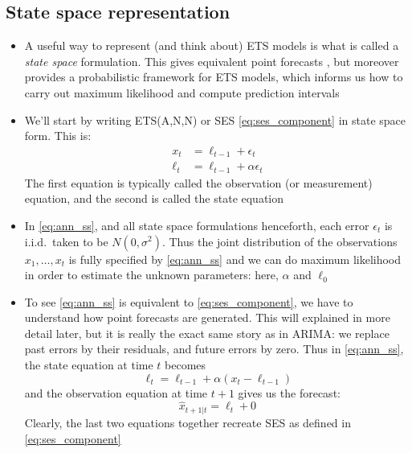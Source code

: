 \documentclass{article}
\begin{document}
\subsection{State space representation}

\begin{itemize}
\item A useful way to represent (and think about) ETS models is what is called
  a \emph{state space} formulation. This gives equivalent point forecasts 
  , but moreover provides a probabilistic framework 
  for ETS models, which informs us how to carry out maximum likelihood and
  compute prediction intervals

\item We'll start by writing ETS(A,N,N) or SES \eqref{eq:ses_component} in state
  space form. This is:  
  \begin{equation}
  \label{eq:ann_ss}
  \begin{aligned}
  x_t &= \ell_{t-1} + \epsilon_t \\
  \ell_t &= \ell_{t-1} + \alpha \epsilon_t
  \end{aligned}
  \end{equation}
  The first equation is typically called the observation (or measurement)
  equation, and the second is called the state equation
  
\item In \eqref{eq:ann_ss}, and all state space formulations henceforth, each
  error $\epsilon_t$ is i.i.d.\ taken to be $N(0, \sigma^2)$. Thus the joint
  distribution of the observations $x_1,\dots,x_t$ is fully specified by
  \eqref{eq:ann_ss} and we can do maximum likelihood in order to estimate the
  unknown parameters: here, $\alpha$ and $\ell_0$ 

\item To see \eqref{eq:ann_ss} is equivalent to \eqref{eq:ses_component}, we
  have to understand how point forecasts are generated. This will explained in
  more detail later, but it is really the exact same story as in ARIMA: we
  replace past errors by their residuals, and future errors by zero. Thus in
  \eqref{eq:ann_ss}, the state equation at time $t$ becomes   
  \[
  \ell_t = \ell_{t-1} + \alpha (x_t - \ell_{t-1})
  \]
  and the observation equation at time $t+1$ gives us the forecast:
  \[
  \hat{x}_{t+1 | t} = \ell_t + 0
  \]
  Clearly, the last two equations together recreate SES as defined in
  \eqref{eq:ses_component}   


\end{itemize}
\end{document}
